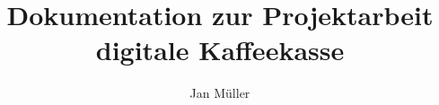 \documentclass[a4paper]{article}
\title{Dokumentation zur Projektarbeit digitale Kaffeekasse}
\author{Jan Müller}
\begin{document}
\maketitle

\begin{abstract}

\end{abstract}

\section{}
\end{document}
